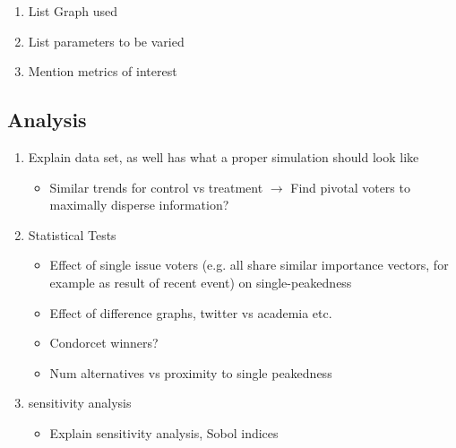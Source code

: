 \begin{enumerate}
	\item List Graph used
	\item List parameters to be varied
	\item Mention metrics of interest

\end{enumerate}


\subsection{Analysis}
\begin{enumerate}
	\item Explain data set, as well has what a proper simulation should look like
	      \begin{itemize}
		      \item Similar trends for control vs treatment $\to$ Find pivotal voters to maximally disperse information?
	      \end{itemize}

	\item Statistical Tests

	      \begin{itemize}
		      \item Effect of single issue voters (e.g. all share similar importance vectors, for example as result of recent event) on single-peakedness
		      \item Effect of difference graphs, twitter vs academia etc.
		      \item Condorcet winners?
		      \item Num alternatives vs proximity to single peakedness
	      \end{itemize}
	\item sensitivity analysis
	      \begin{itemize}
		      \item Explain sensitivity analysis, Sobol indices
	      \end{itemize}
\end{enumerate}

